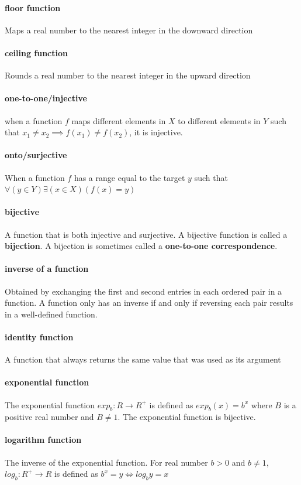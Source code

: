 \documentclass[a4paper]{article}
\begin{document}
\paragraph{floor function} Maps a real number to the nearest integer in the downward direction
\paragraph{ceiling function} Rounds a real number to the nearest integer in the upward direction
\paragraph{one-to-one/injective} when a function $f$ maps different elements in $X$ to different elements in $Y$ such that $x_1 \neq x_2 \implies f(x_1) \neq f(x_2)$, it is injective.
\paragraph{onto/surjective} When a function $f$ has a range equal to the target $y$ such that $\forall (y \in Y) \exists (x \in X) (f(x) = y)$
\paragraph{bijective} A function that is both injective and surjective. A bijective function is called a \textbf{bijection}. A bijection is sometimes called a \textbf{one-to-one correspondence}.
\paragraph{inverse of a function} Obtained by exchanging the first and second entries in each ordered pair in a function. A function only has an inverse if and only if reversing each pair results in a well-defined function.
\paragraph{identity function} A function that always returns the same value that was used as its argument
\paragraph{exponential function} The exponential function $exp_b: R \to R^+$ is defined as $exp_b(x) = b^x$ where $B$ is a positive real number and $B \neq 1$. The exponential function is bijective.
\paragraph{logarithm function} The inverse of the exponential function. For real number $b > 0$ and $b \neq 1$, $log_b: R^+ \to R$ is defined as $b^x = y \iff log_b y = x$
\end{document}
